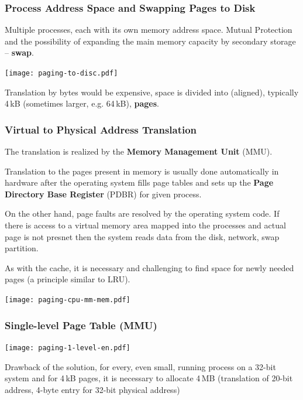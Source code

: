 \documentclass{beamer}
\begin{document}
\begin{frame}
\frametitle{Process Address Space and Swapping Pages to Disk}

Multiple processes, each with its own memory address space. Mutual Protection
and the possibility of expanding the main memory capacity by secondary storage -- \textbf{swap}.

{
\centering

\texttt{[image: paging-to-disc.pdf]}

}

Translation by bytes would be expensive, space is divided into
(aligned), typically 4\,kB (sometimes larger, e.g. 64\,kB), \textbf{pages}.

\end{frame}

\begin{frame}[shrink=1]
\frametitle{Virtual to Physical Address Translation}

The translation is realized by the \textbf{Memory Management Unit} (MMU).

Translation to the pages present in memory is usually done automatically in hardware after
the operating system fills page tables and sets up the \textbf{Page Directory Base Register}
(PDBR) for given process.

On the other hand, page faults are resolved by the operating system code.
If there is access to a virtual memory area mapped into the processes and actual page is not presnet then the system reads data from the disk, network, swap partition.

As with the cache, it is necessary and challenging to find space for newly needed pages (a principle similar to LRU).

\vskip 2mm

{
\centering

\texttt{[image: paging-cpu-mm-mem.pdf]}

}
\end{frame}

\begin{frame}
\frametitle{Single-level Page Table (MMU)}

{
\centering

\texttt{[image: paging-1-level-en.pdf]}

}

Drawback of the solution, for every, even small, running process on a 32-bit
system and for 4\,kB pages, it is necessary to allocate 4\,MB (translation of 20-bit address,
4-byte entry for 32-bit physical address)

\end{frame}
\end{document}
